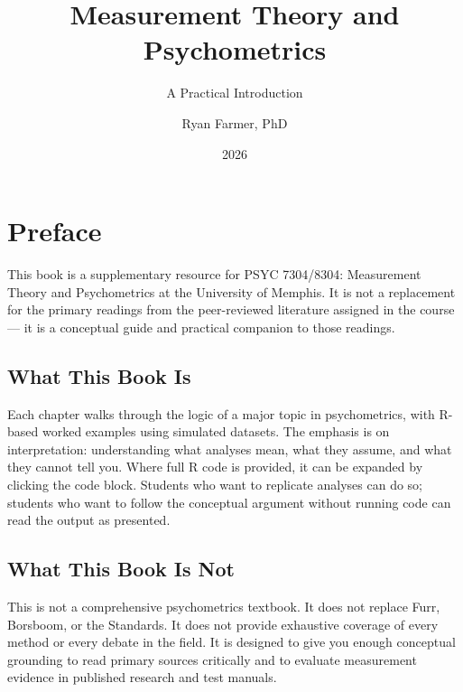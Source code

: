\documentclass[
  11pt,
  letterpaper,
]{scrbook}
\title{Measurement Theory and Psychometrics}
\subtitle{A Practical Introduction}
\author{Ryan Farmer, PhD}
\date{2026}
\renewcommand*\contentsname{Table of contents}
\newcommand\contentsname{Table of contents}
\begin{document}
\frontmatter
\maketitle

\renewcommand*\contentsname{Table of contents}
{
\hypersetup{linkcolor=}
\setcounter{tocdepth}{2}
\tableofcontents
}

\mainmatter
{}

\chapter*{Preface}\label{preface}


This book is a supplementary resource for PSYC 7304/8304: Measurement
Theory and Psychometrics at the University of Memphis. It is not a
replacement for the primary readings from the peer-reviewed literature
assigned in the course --- it is a conceptual guide and practical
companion to those readings.

\section*{What This Book Is}\label{what-this-book-is}


Each chapter walks through the logic of a major topic in psychometrics,
with R-based worked examples using simulated datasets. The emphasis is
on interpretation: understanding what analyses mean, what they assume,
and what they cannot tell you. Where full R code is provided, it can be
expanded by clicking the code block. Students who want to replicate
analyses can do so; students who want to follow the conceptual argument
without running code can read the output as presented.

\section*{What This Book Is Not}\label{what-this-book-is-not}


This is not a comprehensive psychometrics textbook. It does not replace
Furr, Borsboom, or the Standards. It does not provide exhaustive
coverage of every method or every debate in the field. It is designed to
give you enough conceptual grounding to read primary sources critically
and to evaluate measurement evidence in published research and test
manuals.
\end{document}
